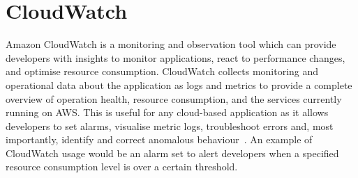 \chapter{CloudWatch}\label{ch:cloudwatch}

Amazon CloudWatch is a monitoring and observation tool which can provide developers with insights to monitor
applications, react to performance changes, and optimise resource consumption.
CloudWatch collects monitoring and operational data about the application as logs and metrics to provide a
complete overview of operation health, resource consumption, and the services currently running on AWS\@.
This is useful for any cloud-based application as it allows developers to set alarms, visualise metric logs,
troubleshoot errors and, most importantly, identify and correct anomalous behaviour~\parencite{amazon2022amazon}.
An example of CloudWatch usage would be an alarm set to alert developers when a specified resource consumption level
is over a certain threshold.


